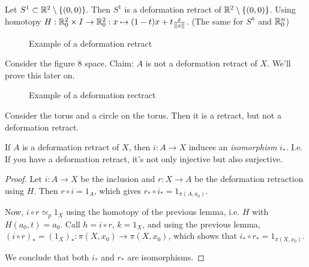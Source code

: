 \begin{eg}
    Let $S^1 \subset \mathbb{R}^2 \setminus \{(0, 0)\}$.
    Then $S^1$ is a deformation retract of $\mathbb{R}^2 \setminus \{ (0, 0)\} $.
    Using homotopy $H: \mathbb{R}^2_0 \times I \to \mathbb{R}^2_0: x \mapsto (1-t)x + t \frac{x}{\|x\|}$.
    (The same for $S^n$ and $\mathbb{R}^n_0$)
    \begin{figure}[H]
        \centering
        \caption{Example of a deformation retract}
        \label{fig:deformation-retract-example}
    \end{figure}
\end{eg}
\begin{eg}
    Consider the figure $8$ space.
    Claim: $A$ is not a deformation retract of $X$.
    We'll prove this later on.
\begin{figure}[H]
    \centering
    \caption{Example of a deformation rectract}
    \label{fig:deformation-rectract-example-2}
\end{figure}
\end{eg}

\begin{eg}
    Consider the torus and a circle on the torus.
    Then it is a retract, but not a deformation retract.
\end{eg}

\begin{theorem}
    If $A$ is a deformation retract of $X$, then $i : A \to X$ induces an \emph{isomorphism} $i_*$.
    I.e. If you have a deformation retract, it's not only injective but also surjective.
\end{theorem}
\begin{proof}
    Let $i:  A \to X$ be the inclusion and $r: X \to A$ be the deformation retraction using $H$.
    Then $r  \circ  i = 1_A$, which gives $r_*  \circ  i_* = 1_{\pi(A, a_0)}$.

    Now, $i  \circ  r \simeq_p  1_X$ using the homotopy of the previous lemma, i.e. $H$ with $H(a_0, t) = a_0$.
    Call $h = i  \circ  r$, $k = 1_X$, and using the previous lemma, $(i  \circ  r)_* = (1_X)_*: \pi(X, x_0) \to \pi(X, x_0)$, which shows that $i_*  \circ r_* = 1_{\pi(X, x_0)}$.

    We conclude that both $i_*$ and $r_*$ are isomorphisms.
\end{proof}

